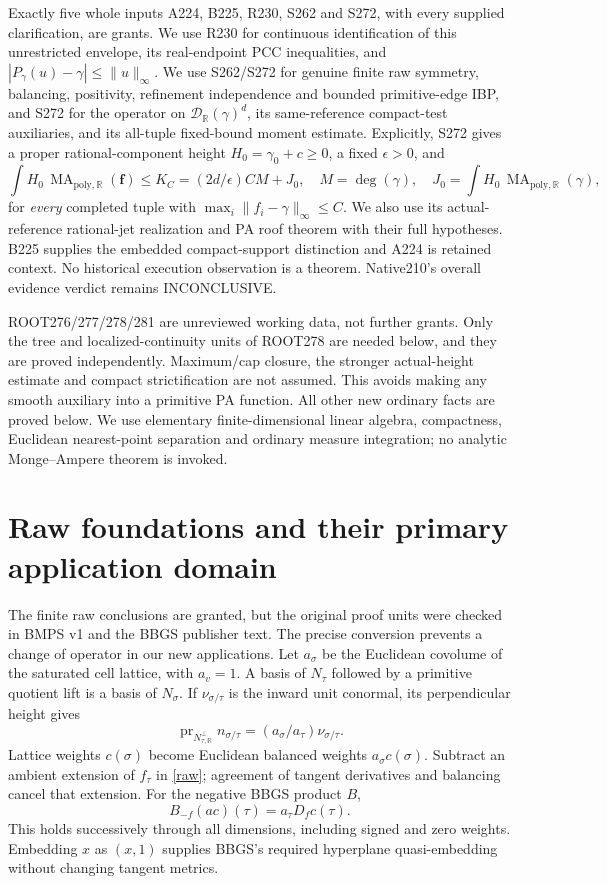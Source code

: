 \documentclass[11pt]{article}
\newcommand{\R}{\mathbb R}
\newcommand{\MA}{\operatorname{MA}_{\mathrm{poly},\R}}
\newcommand{\D}{\mathcal D_\R(\gamma)}
\begin{document}
Exactly five whole inputs A224, B225, R230, S262 and S272, with every
supplied clarification, are grants. We use R230 for continuous
identification of this unrestricted envelope, its real-endpoint PCC
inequalities, and $|P_\gamma(u)-\gamma|\leq\|u\|_\infty$. We use
S262/S272 for genuine finite raw symmetry, balancing, positivity,
refinement independence and bounded primitive-edge IBP, and S272 for
the operator on $\D^d$, its same-reference compact-test auxiliaries,
and its all-tuple fixed-bound moment estimate. Explicitly, S272 gives
a proper rational-component height $H_0=\gamma_0+c\geq0$, a fixed
$\epsilon>0$, and
\begin{equation}\label{grantedmoment}
 \int H_0\,\MA(\mathbf f)\leq K_C=(2d/\epsilon)CM+J_0,
 \quad M=\deg(\gamma),\quad J_0=\int H_0\,\MA(\gamma),
\end{equation}
for \emph{every} completed tuple with
$\max_i\|f_i-\gamma\|_\infty\leq C$. We also use its actual-reference
rational-jet realization and PA roof theorem with their full hypotheses.
B225 supplies the embedded compact-support distinction and A224 is
retained context. No historical execution observation is a theorem.
Native210's overall evidence verdict remains INCONCLUSIVE.

ROOT276/277/278/281 are unreviewed working data, not further grants.
Only the tree and localized-continuity units of ROOT278 are needed
below, and they are proved independently. Maximum/cap closure, the
stronger actual-height estimate and compact strictification are not
assumed. This avoids making any smooth auxiliary into a primitive PA
function. All other new ordinary facts are proved below. We use
elementary finite-dimensional linear algebra, compactness, Euclidean
nearest-point separation and ordinary measure integration; no analytic
Monge--Ampere theorem is invoked.

\section{Raw foundations and their primary application domain}
The finite raw conclusions are granted, but the original proof units
were checked in BMPS v1 and the BBGS publisher text. The precise
conversion prevents a change of operator in our new applications.
Let $a_\sigma$ be the Euclidean covolume of the saturated cell lattice,
with $a_v=1$. A basis of $N_\tau$ followed by a primitive quotient lift
is a basis of $N_\sigma$. If $\nu_{\sigma/\tau}$ is the inward unit
conormal, its perpendicular height gives
\[
 \operatorname{pr}_{N_{\tau,\R}^{\perp}} n_{\sigma/\tau}
 =(a_\sigma/a_\tau)\nu_{\sigma/\tau}.
\]
Lattice weights $c(\sigma)$ become Euclidean balanced weights
$a_\sigma c(\sigma)$. Subtract an ambient extension of $f_\tau$ in
\eqref{raw}; agreement of tangent derivatives and balancing cancel
that extension. For the negative BBGS product $B$,
\[
 B_{-f}(ac)(\tau)=a_\tau D_f c(\tau).
\]
This holds successively through all dimensions, including signed and
zero weights. Embedding $x$ as $(x,1)$ supplies BBGS's required
hyperplane quasi-embedding without changing tangent metrics.
\end{document}
